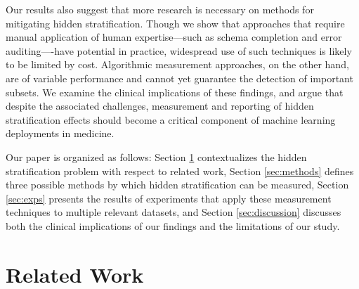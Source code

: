 \documentclass[sigconf]{acmart}
\begin{document}
Our results also suggest that more research is necessary on methods for mitigating hidden stratification.  
Though we show that approaches that require manual application of human expertise---such as schema completion and error auditing----have potential in practice, widespread use of such techniques is likely to be limited by cost.
Algorithmic measurement approaches, on the other hand, are of variable performance and cannot yet guarantee the detection of important subsets.
We examine the clinical implications of these findings, and argue that despite the associated challenges, measurement and reporting of hidden stratification effects should become a critical component of machine learning deployments in medicine.

Our paper is organized as follows: Section \ref{sec:relwork} contextualizes the hidden stratification problem with respect to related work, Section \ref{sec:methods} defines three possible methods by which hidden stratification can be measured, Section \ref{sec:exps} presents the results of experiments that apply these measurement techniques to multiple relevant datasets, and Section \ref{sec:discussion} discusses both the clinical implications of our findings and the limitations of our study.

\section{Related Work}
\label{sec:relwork}
\end{document}
